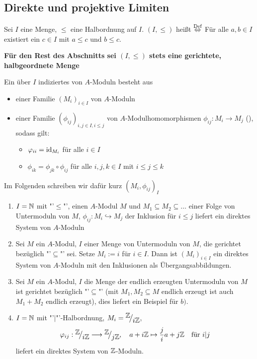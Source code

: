 \subsection{Direkte und projektive Limiten}
\begin{df}\label{16.1}
	Sei $I$ eine Menge, $\leq$ eine Halbordnung auf $I$. $(I, \leq)$ heißt  $\overset{\text{Def}}{\Leftrightarrow}$ Für alle $a,b\in I$ existiert ein $c\in I$ mit $a\leq c$ und $b\leq c$.
\end{df}
\begin{center}
	\textbf{Für den Rest des Abschnitts sei $(I, \leq)$ stets eine gerichtete, halbgeordnete Menge}
\end{center}
\begin{df}\label{16.2}
	Ein über $I$ indiziertes  von $A$-Moduln besteht aus
	\begin{itemize}
		\item einer Familie $(M_i)_{i\in I}$ von $A$-Moduln
		\item einer Familie $(\phi_{ij})_{i,j\in I, i\leq j}$ von $A$-Modulhomomorphismen $\phi_{ij}:M_i \to M_j$ (), sodass gilt:
		\begin{itemize}
			\item $\varphi_{ii}= \operatorname{id}_{M_i}$ für alle $i\in I$
			\item $\phi_{ik}= \phi_{jk} \circ \phi_{ij}$ für alle $i,j,k\in I$ mit $i\leq j \leq k$
		\end{itemize}
	\end{itemize} 
	Im Folgenden schreiben wir dafür kurz $(M_i, \phi_{ij})_I$
\end{df}
\begin{bsp}\label{16.3}
	\begin{enumerate}[label = \alph*)]
		\item $I=\mathbb{N}$ mit "'$\leq$"', einen $A$-Modul $M$ und $M_1 \subseteq M_2 \subseteq \ldots $ einer Folge von Untermoduln von $M$, $\phi_{ij}:M_i \hookrightarrow M_j$ der Inklusion für $i\leq j$ liefert ein direktes System von $A$-Moduln
		\item Sei $M$ ein $A$-Modul, $I$ einer Menge von Untermoduln von $M$, die gerichtet bezüglich "'$\subseteq$"' sei. Setze $M_i:= i$ für $i\in I$. Dann ist $(M_i)_{i\in I}$ ein direktes System von $A$-Moduln mit den Inklusionen als Übergangsabbildungen.
		\item Sei $M$ ein $A$-Modul, $I$ die Menge der endlich erzeugten Untermoduln von $M$ ist gerichtet bezüglich "'$\subseteq$"' (mit $M_1, M_2\subseteq M$ endlich erzeugt ist auch $M_1+M_2$ endlich erzeugt), dies liefert ein Beispiel für $b)$.
		\item $I=\mathbb{N}$ mit "'$\big| $"'-Halbordnung, $M_i= \QR{\Z}{i\Z}$, 
		$$\phi_{ij}:\QR{\Z}{i\Z} \longrightarrow \QR{\Z}{j\Z}, \quad a+ i\Z\mapsto \frac{j}{i}a + j\Z\quad \text{für } i|j$$
		liefert ein direktes System von $\mathbb{Z}$-Moduln.
	\end{enumerate}
\end{bsp}
